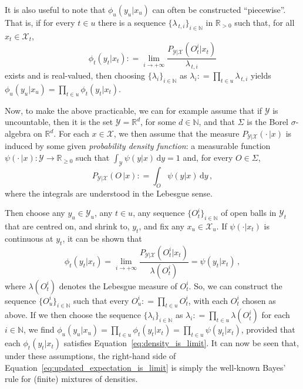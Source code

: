 \documentclass[twoside,11pt]{article}
\newcommand{\nats}{\mathbb{N}}
\newcommand{\reals}{\mathbb{R}}
\newcommand{\realspos}{\reals_{>0}}
\newcommand{\realsnonneg}{\reals_{\geq 0}}
\newcommand{\states}{\mathcal{X}}
\newcommand{\observs}{\mathcal{Y}}
\newcommand{\coloneqq}{:\!=}
\begin{document}
It is also useful to note that $\phi_u(y_u\vert x_u)$ can often be constructed ``piecewise''. That is, if for every $t\in u$ there is a sequence $\{\lambda_{\,t,i}\}_{i\in\nats}$ in $\realspos$ such that, for all $x_t\in\states_t$,
\begin{equation*}
\phi_t(y_t\vert x_t)\coloneqq \lim_{i\to+\infty} \frac{P_{\observs\vert\states}(O_t^i\vert x_t)}{\lambda_{\,t,i}}
\end{equation*}
exists and is real-valued, then choosing $\{\lambda_i\}_{i\in\nats}$ as $\lambda_i\coloneqq \prod_{t\in u}\lambda_{\,t,i}$ yields $\phi_u(y_u\vert x_u)=\prod_{t\in u}\phi_t(y_t\vert x_t)$. 

Now, to make the above practicable, we can for example assume that if $\observs$ is uncountable, then it is the set $\observs=\reals^d$, for some $d\in\nats$, and that $\Sigma$ is the Borel $\sigma$-algebra on $\reals^d$. 
For each $x\in\states$, we then assume that the measure $P_{\observs\vert\states}(\cdot\,\vert x)$ is induced by some given \emph{probability density function}: a measurable function $\psi(\cdot\,\vert x):\observs\to\realsnonneg$ such that $\int_\observs \psi(y\vert x)\,\mathrm{d}y=1$ and, for every $O\in\Sigma$,
\begin{equation*}
P_{\observs\vert\states}(O\,\vert x) \coloneqq \int_O \psi(y\vert x)\,\mathrm{d}y\,,
\end{equation*}
where the integrals are understood in the Lebesgue sense.

Then choose any $y_u\in\observs_u$, any $t\in u$, any sequence $\{O_t^i\}_{i\in\nats}$ of open balls in $\observs_t$ that are centred on, and shrink to, $y_t$, and fix any $x_u\in\states_u$. If $\psi(\cdot\vert x_t)$ is continuous at $y_t$, it can be shown that
\begin{equation}\label{eq:density_is_limit}
\phi_t(y_t\vert x_t) = \lim_{i\to+\infty} \frac{P_{\observs\vert\states}(O_t^i\vert x_t)}{\lambda(O_t^i)} = \psi(y_t\vert x_t)\,,
\end{equation}
where $\lambda(O_t^i)$ denotes the Lebesgue measure of $O_t^i$. So, we can construct the sequence $\{O_u^i\}_{i\in\nats}$ such that every $O_u^i\coloneqq \prod_{t\in u}O_t^i$, with each $O_t^i$ chosen as above. If we then choose the sequence $\{\lambda_i\}_{i\in\nats}$ as $\lambda_i\coloneqq \prod_{t\in u}\lambda(O_t^i)$ for each $i\in\nats$, we find 
$\phi_u(y_u\vert x_u) = \prod_{t\in u}\phi_t(y_t\vert x_t)=\prod_{t\in u}\psi(y_t\vert x_t)$, 
provided that each $\phi_t(y_t\vert x_t)$ satisfies Equation~\eqref{eq:density_is_limit}. 
It can now be seen that, under these assumptions, the right-hand side of Equation~\eqref{eq:updated_expectation_is_limit} is simply the well-known Bayes' rule for (finite) mixtures of densities. 
\end{document}

